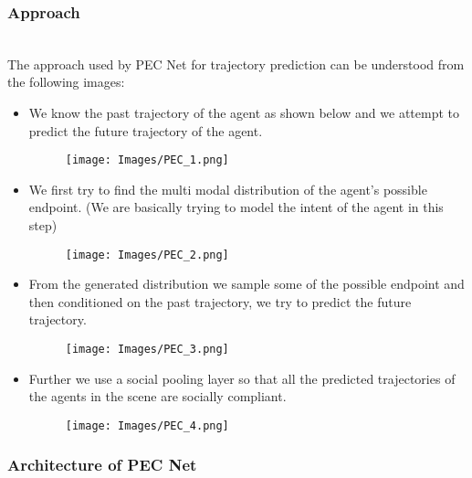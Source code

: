 \documentclass[conference]{IEEEtran}
\begin{document}
\subsubsection*{\textbf{Approach}} \\
The approach used by PEC Net for trajectory prediction can be understood from the following images:
\begin{itemize}
  \item We know the past trajectory of the agent as shown below and we attempt to predict the future trajectory of the agent.
        \begin{figure}[H]
          \centering
          \texttt{[image: Images/PEC\_1.png]}
        \end{figure}
  \item We first try to find the multi modal distribution of the agent's possible endpoint. (We are basically trying to model the intent of the agent in this step)
        \begin{figure}[H]
          \centering
          \texttt{[image: Images/PEC\_2.png]}
        \end{figure}
  \item From the generated distribution we sample some of the possible endpoint and then conditioned on the past trajectory, we try to predict the future trajectory.
        \begin{figure}[H]
          \centering
          \texttt{[image: Images/PEC\_3.png]}
        \end{figure}
  \item Further we use a social pooling layer so that all the predicted trajectories of the  agents in the scene are socially compliant.
        \begin{figure}[H]
          \centering
          \texttt{[image: Images/PEC\_4.png]}
        \end{figure}
\end{itemize}

\subsubsection*{\textbf{Architecture of PEC Net}}
\end{document}
